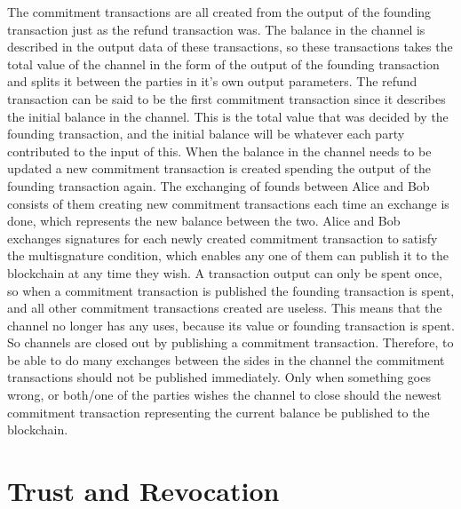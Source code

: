 \documentclass[informationsecurity]{gucmasterproject}
\begin{document}
The commitment transactions are all created from the output of the founding transaction just as the refund transaction was. The balance in the channel is described in the output data of these transactions, so these transactions takes the total value of the channel in the form of the output of the founding transaction and splits it between the parties in it's own output parameters. The refund transaction can be said to be the first commitment transaction since it describes the initial balance in the channel. This is the total value that was decided by the founding transaction, and the initial balance will be whatever each party contributed to the input of this. When the balance in the channel needs to be updated a new commitment transaction is created spending the output of the founding transaction again. The exchanging of founds between Alice and Bob consists of them creating new commitment transactions each time an exchange is done, which represents the new balance between the two. Alice and Bob exchanges signatures for each newly created commitment transaction to satisfy the multisgnature condition, which enables any one of them can publish it to the blockchain at any time they wish. A transaction output can only be spent once, so when a commitment transaction is published the founding transaction is spent, and all other commitment transactions created are useless. This means that the channel no longer has any uses, because its value or founding transaction is spent. So channels are closed out by publishing a commitment transaction. Therefore, to be able to do many exchanges between the sides in the channel the commitment transactions should not be published immediately. Only when something goes wrong, or both/one of the parties wishes the channel to close should the newest commitment transaction representing the current balance be published to the blockchain. 

\section{Trust and Revocation}
\end{document}
